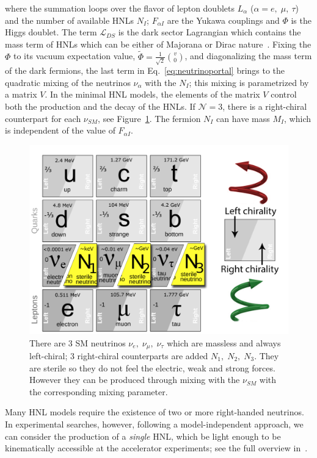 where the summation loops over the flavor of lepton doublets
${L}_{\alpha}$ ($\alpha = e,\; \mu, \: \tau$) and the number of
available HNLs $N_{I}$; $F_{\alpha I} $ are the Yukawa couplings and
$\Phi$ is the Higgs doublet. The term $\mathcal{L}_{DS}$ is the dark
sector Lagrangian which contains the mass term of HNLs which can be
either of Majorana or Dirac nature~\cite{Alekhin_2016}.
Fixing the $\Phi$ to its vacuum expectation value, $\widetilde \Phi = \frac{1}{\sqrt{2}} \binom{v}{0}$, and diagonalizing the mass term of the dark fermions, the last term in Eq.~\ref{eq:neutrinoportal} brings to the quadratic mixing of the neutrinos $\nu_{\alpha}$ with the $N_{I}$; this mixing is parametrized by a matrix $V$. In the minimal HNL models, the elements of the matrix $V$ control both the production and the decay of the HNLs. 
If $\mathcal{N} = 3$, there is a right-chiral counterpart for each $\nu_{SM}$, see Figure~\ref{fig:c3sm_extension}. The fermion $N_I$ can have mass $M_I$, which is independent  of the value of $F_{\alpha I}$.
\begin{figure}[t!]
  \centering
  \includegraphics[width=.60\textwidth]{Figures/c3/SM_extension}
    \caption{There are 3 SM neutrinos $\nu_{e}, \; \nu_{\mu}, \;\nu_{\tau}$ which are massless and always left-chiral; 3 right-chiral counterparts are added $N_{1}, \; N_{2}, \;N_{3}$. They are sterile so they do not feel the electric, weak and strong forces. However they can be produced through mixing with the $\nu_{SM}$ with the corresponding mixing parameter.}
  \label{fig:c3sm_extension}
\end{figure}

Many HNL models require the existence of two or more right-handed neutrinos. In experimental searches, however, following a model-independent approach, we can consider the production of a \emph{single} HNL, which be light enough to be kinematically accessible at the accelerator experiments; see the full overview in~\cite{Atre_2009}. 

